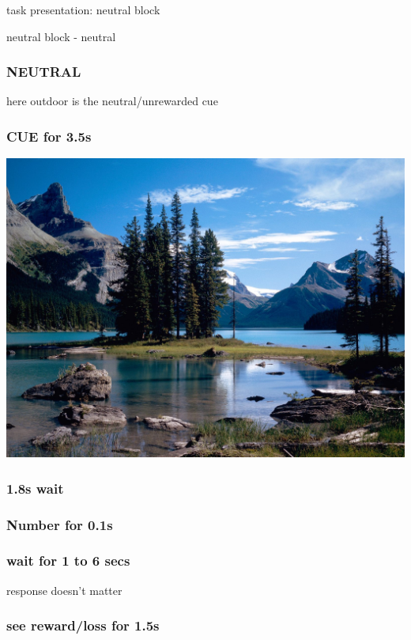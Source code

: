 \documentclass{beamer}
\begin{document}
\begin{section}{task presentation: neutral block}
\begin{subsection}{neutral block - neutral}
\begin{frame} \frametitle{NEUTRAL} here outdoor is the neutral/unrewarded cue \end{frame}
\begin{frame} \frametitle{CUE for 3.5s}
   \begin{center}
	\includegraphics[width=.5\textwidth]{../imgs/Scenes/Outdoors/the-great-outdoors.jpg} \\
   \end{center}
\end{frame}

\begin{frame} \frametitle{1.8s wait} \end{frame}
\begin{frame} \frametitle{Number for 0.1s}  \end{frame}
\begin{frame} \frametitle{wait for 1 to 6 secs} \tiny{response doesn't matter}\end{frame}
\begin{frame} 
 \frametitle{see reward/loss for 1.5s}
   \begin{center}
   \end{center}
\end{frame}

\end{subsection}
\end{section}
\end{document}
